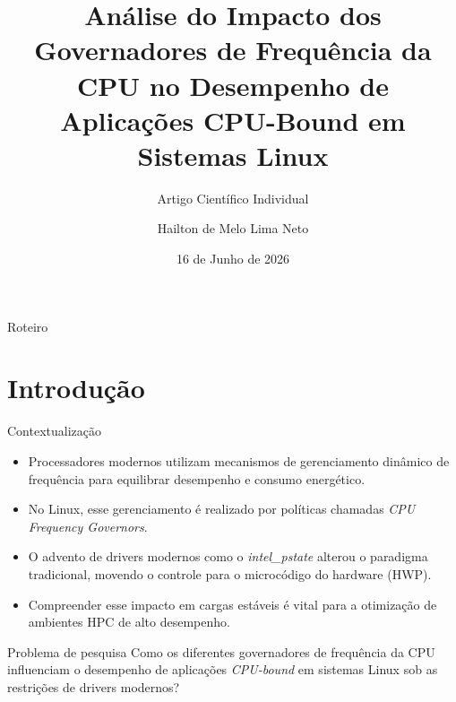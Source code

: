 \documentclass[aspectratio=169,10pt]{beamer}
\title[Governadores Linux]{Análise do Impacto dos Governadores de Frequência da CPU no Desempenho de Aplicações CPU-Bound em Sistemas Linux}
\subtitle{Artigo Científico Individual}
\author[Hailton Neto]{Hailton de Melo Lima Neto}
\institute[CESAR School]{
CESAR School \\
Análise e Desenvolvimento de Sistemas \\
\small Professor: Ronierison Maciel
}
\date{16 de Junho de 2026}
\begin{document}
\frame{\titlepage}

\begin{frame}{Roteiro}
    \tableofcontents
\end{frame}


\section{Introdução}

\begin{frame}{Contextualização}
    \begin{itemize}
        \item Processadores modernos utilizam mecanismos de gerenciamento dinâmico de frequência para equilibrar desempenho e consumo energético.
        \item No Linux, esse gerenciamento é realizado por políticas chamadas \textit{CPU Frequency Governors}.
        \item O advento de drivers modernos como o \textit{intel\_pstate} alterou o paradigma tradicional, movendo o controle para o microcódigo do hardware (HWP).
        \item Compreender esse impacto em cargas estáveis é vital para a otimização de ambientes HPC de alto desempenho.
    \end{itemize}
    
    \begin{block}{Problema de pesquisa}
    Como os diferentes governadores de frequência da CPU influenciam o desempenho de aplicações \textit{CPU-bound} em sistemas Linux sob as restrições de drivers modernos?
    \end{block}
\end{frame}
\end{document}
